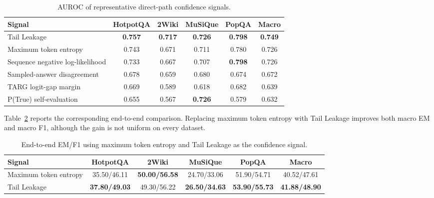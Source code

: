 \begin{table}[h]
    \centering
    \caption[Representative Confidence Signals]{AUROC of representative direct-path confidence signals.}
    \label{tab:signal-battery}
    \setlength{\tabcolsep}{6pt}
    \small
    \begin{tabular}{ l c c c c c }
        \toprule
        Signal & HotpotQA & 2Wiki & MuSiQue & PopQA & Macro \\
        \midrule
        Tail Leakage & \textbf{0.757} & \textbf{0.717} & \textbf{0.726} & \textbf{0.798} & \textbf{0.749} \\
        Maximum token entropy & 0.743 & 0.671 & 0.711 & 0.780 & 0.726 \\
        Sequence negative log-likelihood & 0.733 & 0.667 & 0.707 & \textbf{0.798} & 0.726 \\
        Sampled-answer disagreement & 0.678 & 0.659 & 0.680 & 0.674 & 0.672 \\
        TARG logit-gap margin & 0.669 & 0.589 & 0.618 & 0.682 & 0.639 \\
        P(True) self-evaluation & 0.655 & 0.567 & \textbf{0.726} & 0.579 & 0.632 \\
        \bottomrule
    \end{tabular}
\end{table}

Table~\ref{tab:entropy-vs-tail-emf1} reports the corresponding end-to-end comparison. Replacing maximum token entropy with Tail Leakage improves both macro EM and macro F1, although the gain is not uniform on every dataset.

\begin{table}[h]
    \centering
    \caption[Maximum Entropy vs. Tail Leakage]{End-to-end EM/F1 using maximum token entropy and Tail Leakage as the confidence signal.}
    \label{tab:entropy-vs-tail-emf1}
    \setlength{\tabcolsep}{4pt}
    \small
    \begin{tabular}{ l c c c c c }
        \toprule
        Signal & HotpotQA & 2Wiki & MuSiQue & PopQA & Macro \\
        \midrule
        Maximum token entropy & 35.50/46.11 & \textbf{50.00/56.58} & 24.70/33.06 & 51.90/54.71 & 40.52/47.61 \\
        Tail Leakage & \textbf{37.80/49.03} & 49.30/56.22 & \textbf{26.50/34.63} & \textbf{53.90/55.73} & \textbf{41.88/48.90} \\
        \bottomrule
    \end{tabular}
\end{table}


